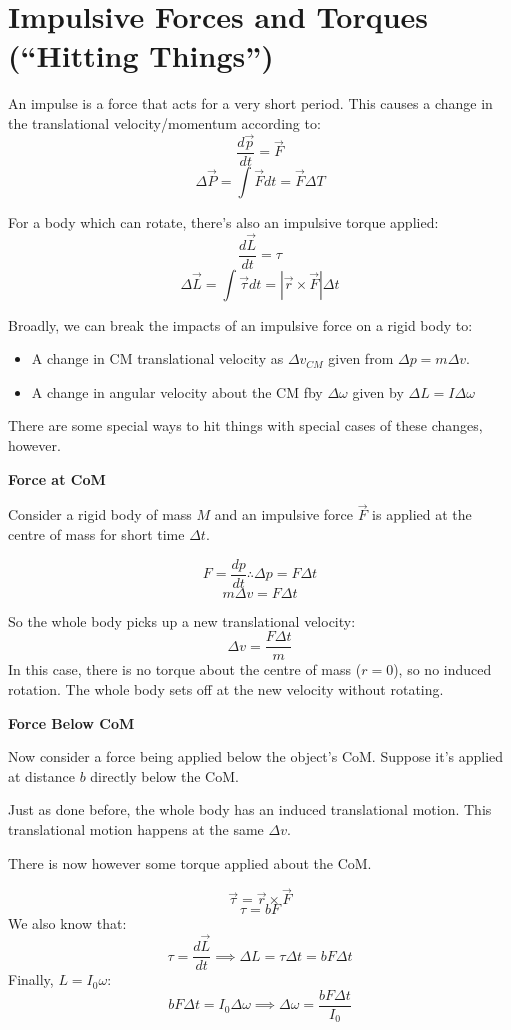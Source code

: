 \section{Impulsive Forces and Torques (``Hitting Things'')}
An impulse is a force that acts for a very short period. This causes a change in the translational velocity/momentum according to:
\[
    \frac{d \vec{p}}{dt} = \vec{F}
\]
\[
    \Delta \vec{P} = \int \vec{F} dt = \vec{F} \Delta T
\]

For a body which can rotate, there's also an impulsive torque applied:
\[
    \frac{d \vec{L}}{dt} = \tau
\]
\[
    \Delta \vec{L} = \int \vec{\tau} dt = | \vec{r} \times \vec{F}| \Delta t
\]

Broadly, we can break the impacts of an impulsive force on a rigid body to:
\begin{itemize}
    \item A change in CM translational velocity as $\Delta v_{CM}$ given from $\Delta p = m \Delta v$.
    \item A change in angular velocity about the CM fby $\Delta \omega$ given by $\Delta L = I \Delta \omega$
\end{itemize}

There are some special ways to hit things with special cases of these changes, however. 

\textbf{Force at CoM}

Consider a rigid body of mass $M$ and an impulsive force $\vec{F}$ is applied at the centre of mass for short time $\Delta t$.

\[
    F = \frac{dp}{dt} \therefore \Delta p = F \Delta t 
\]
\[
    m \Delta v = F \Delta t
\]

So the whole body picks up a new translational velocity:
\[
    \Delta v = \frac{F \Delta t}{m} \tag{1}
\]
In this case, there is no torque about the centre of mass ($r = 0$), so no induced rotation. The whole body sets off at the new velocity without rotating.

\textbf{Force Below CoM}

Now consider a force being applied below the object's CoM. Suppose it's applied at distance $b$ directly below the CoM.

Just as done before, the whole body has an induced translational motion. This translational motion happens at the same $\Delta v$. 

There is now however some torque applied about the CoM.

\[
    \vec{\tau} = \vec{r} \times \vec{F}
\]
\[
    \tau = bF
\]
We also know that:
\[
    \tau = \frac{d \vec{L}}{dt} \implies \boxed{\Delta L = \tau \Delta t = bF \Delta t}
\]
Finally, $L = I_0 \omega$:
\[
    bF \Delta t = I_0 \Delta \omega \implies \boxed{\Delta \omega = \frac{b F \Delta t}{I_0}} \tag{2}
\]

